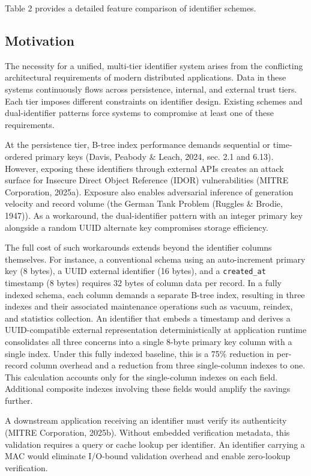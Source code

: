 \documentclass[fleqn,10pt,lineno]{wlpeerj}
\begin{document}
Table 2 provides a detailed feature comparison of identifier schemes.

\newpage

\subsection{Motivation}\label{motivation}

The necessity for a unified, multi-tier identifier system arises from
the conflicting architectural requirements of modern distributed
applications. Data in these systems continuously flows across
persistence, internal, and external trust tiers. Each tier imposes
different constraints on identifier design. Existing schemes and
dual-identifier patterns force systems to compromise at least one of
these requirements.

At the persistence tier, B-tree index performance demands sequential or
time-ordered primary keys (Davis, Peabody \& Leach, 2024, sec. 2.1 and
6.13). However, exposing these identifiers through external APIs creates
an attack surface for Insecure Direct Object Reference (IDOR)
vulnerabilities (MITRE Corporation, 2025a). Exposure also enables
adversarial inference of generation velocity and record volume (the
German Tank Problem (Ruggles \& Brodie, 1947)). As a workaround, the
dual-identifier pattern with an integer primary key alongside a random
UUID alternate key compromises storage efficiency.

The full cost of such workarounds extends beyond the identifier columns
themselves. For instance, a conventional schema using an auto-increment
primary key (8 bytes), a UUID external identifier (16 bytes), and a
\texttt{created\_at} timestamp (8 bytes) requires 32 bytes of column
data per record. In a fully indexed schema, each column demands a
separate B-tree index, resulting in three indexes and their associated
maintenance operations such as vacuum, reindex, and statistics
collection. An identifier that embeds a timestamp and derives a
UUID-compatible external representation deterministically at application
runtime consolidates all three concerns into a single 8-byte primary key
column with a single index. Under this fully indexed baseline, this is a
75\% reduction in per-record column overhead and a reduction from three
single-column indexes to one. This calculation accounts only for the
single-column indexes on each field. Additional composite indexes
involving these fields would amplify the savings further.

A downstream application receiving an identifier must verify its
authenticity (MITRE Corporation, 2025b). Without embedded verification
metadata, this validation requires a query or cache lookup per
identifier. An identifier carrying a MAC would eliminate I/O-bound
validation overhead and enable zero-lookup verification.
\end{document}
